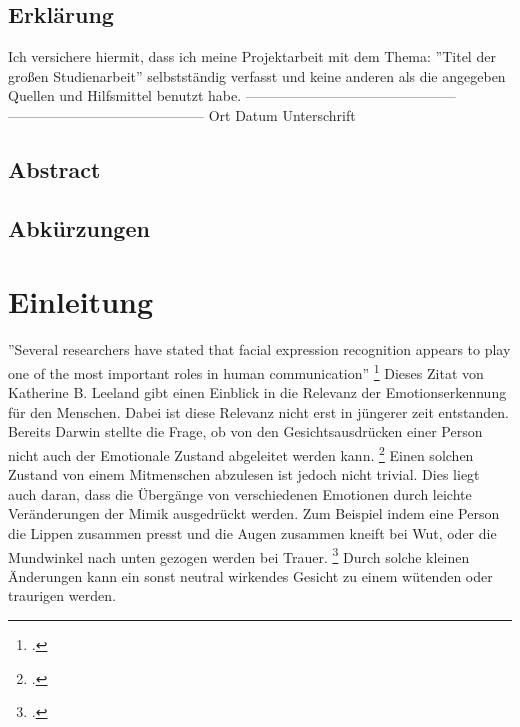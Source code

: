 \documentclass[12pt, a4paper]{scrbook}
\begin{document}

\setlength{\parindent}{0em} 
\renewcommand\thechapter{\Roman{chapter}}
\let\cleardoublepage\relax
\section*{Erklärung}
Ich versichere hiermit, dass ich meine Projektarbeit mit dem Thema: ''Titel der großen Studienarbeit'' selbstständig verfasst und keine anderen als die angegeben Quellen und Hilfsmittel benutzt habe. 
\newline
\newline
\newline
\newline
---------------------------------------------       ------------------------------------------ \newline
Ort	\hspace{2cm}		Datum\hspace{3,5 cm}				    Unterschrift
\newpage
\section*{Abstract}


\newpage
\begingroup
\renewcommand*{\chapterpagestyle}{empty}
\pagestyle{empty}
\tableofcontents
\listoffigures
\section*{Abkürzungen}
\begin{acronym}[Bash]
\end{acronym}
\endgroup
\newpage
\pagestyle{plain}
\setcounter{page}{1}

\chapter{Einleitung}
''Several researchers have stated that facial expression recognition appears to play one of the most important roles in human communication'' 
\footcite[Vgl.][1]{FaceRec}
Dieses Zitat von Katherine B. Leeland gibt einen Einblick in die Relevanz der Emotionserkennung für den Menschen. Dabei ist diese Relevanz nicht erst in jüngerer zeit entstanden. Bereits Darwin stellte die Frage, ob von den Gesichtsausdrücken einer Person nicht auch der Emotionale Zustand abgeleitet werden kann.
\footcite[Vgl.][2]{FaceRec}
Einen solchen Zustand von einem Mitmenschen abzulesen ist jedoch nicht trivial. Dies liegt auch daran, dass die Übergänge von verschiedenen Emotionen durch leichte Veränderungen der Mimik ausgedrückt werden. Zum Beispiel indem eine Person die Lippen zusammen presst und die Augen zusammen kneift bei Wut, oder die Mundwinkel nach unten gezogen werden bei Trauer. 
\footcite[Vgl.][249]{HandbookFaceRec}
Durch solche kleinen Änderungen kann ein sonst neutral wirkendes Gesicht zu einem wütenden oder traurigen werden.
\end{document}
